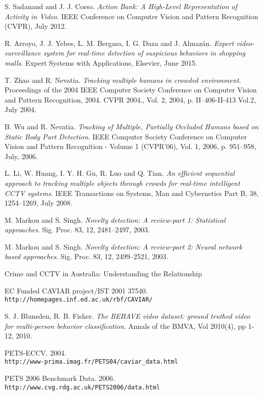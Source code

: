 \begin{thebibliography}{20}
S. Sadanand and J. J. Corso.
\textit{Action Bank: A High-Level Representation of Activity in Video}. 
IEEE Conference on Computer Vision and Pattern Recognition (CVPR), July 2012. 

R. Arroyo, J. J. Yebes, L. M. Bergasa, I. G. Daza and J. Almazán.
\textit{Expert video-surveillance system for real-time detection of suspicious behaviors in shopping malls}. 
Expert Systems with Applications, Elsevier, June 2015.

T. Zhao and R. Nevatia.
\textit{Tracking multiple humans in crowded environment}. 
Proceedings of the 2004 IEEE Computer Society Conference on Computer Vision and Pattern Recognition, 2004. CVPR 2004., Vol. 2, 2004, p. II–406-II-413 Vol.2, July 2004.

B. Wu and R. Nevatia.
\textit{Tracking of Multiple, Partially Occluded Humans based on Static Body Part Detection}. 
IEEE Computer Society Conference on Computer Vision and Pattern Recognition - Volume 1 (CVPR'06), Vol. 1, 2006, p. 951–958, July, 2006.

L. Li, W. Huang, I. Y. H. Gu, R. Luo and Q. Tian.
\textit{An efficient sequential approach to tracking multiple objects through crowds for real-time intelligent CCTV systems}. 
IEEE Transactions on Systems, Man and Cybernetics Part B, 38, 1254–1269, July 2008.

M. Markou and S. Singh.
\textit{Novelty detection: A review-part 1: Statistical approaches}. 
Sig. Proc. 83, 12, 2481–2497, 2003.

M. Markou and S. Singh.
\textit{Novelty detection: A review-part 2: Neural network based approaches}. 
Sig. Proc. 83, 12, 2499–2521, 2003.

\textit{} 
Crime and CCTV in Australia: Understanding the Relationship

EC Funded CAVIAR project/IST 2001 37540.
\\\texttt{http://homepages.inf.ed.ac.uk/rbf/CAVIAR/}

S. J. Blunsden, R. B. Fisher.
\textit{The BEHAVE video dataset: ground truthed video for multi-person behavior classification}. 
Annals of the BMVA, Vol 2010(4), pp 1-12, 2010.

PETS-ECCV. 2004.
\\\texttt{http://www-prima.imag.fr/PETS04/caviar\_data.html}

PETS 2006 Benchmark Data. 2006.
\\\texttt{http://www.cvg.rdg.ac.uk/PETS2006/data.html}
 


\end{thebibliography}
